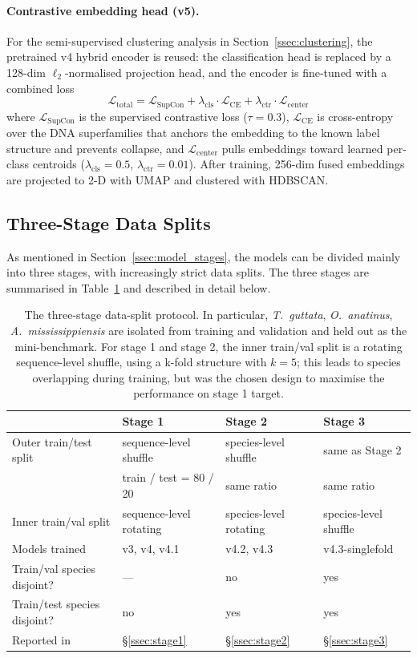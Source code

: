 \documentclass[12pt]{article}
\begin{document}
\paragraph{Contrastive embedding head (v5).} For the semi-supervised clustering analysis in Section~\ref{ssec:clustering}, the pretrained v4 hybrid encoder is reused: the classification head is replaced by a 128-dim $\ell_2$-normalised projection head, and the encoder is fine-tuned with a combined loss
\[
\mathcal{L}_{\text{total}} = \mathcal{L}_{\text{SupCon}} + \lambda_{\text{cls}} \cdot \mathcal{L}_{\text{CE}} + \lambda_{\text{ctr}} \cdot \mathcal{L}_{\text{center}}
\]
where $\mathcal{L}_{\text{SupCon}}$ is the supervised contrastive loss \cite{khosla2020supervised} ($\tau = 0.3$), $\mathcal{L}_{\text{CE}}$ is cross-entropy over the DNA superfamilies that anchors the embedding to the known label structure and prevents collapse, and $\mathcal{L}_{\text{center}}$ pulls embeddings toward learned per-class centroids ($\lambda_{\text{cls}} = 0.5$, $\lambda_{\text{ctr}} = 0.01$). After training, 256-dim fused embeddings are projected to 2-D with UMAP and clustered with HDBSCAN.

\subsection{Three-Stage Data Splits}\label{ssec:splits}

As mentioned in Section~\ref{ssec:model_stages}, the models can be divided mainly into three stages, with increasingly strict data splits. The three stages are summarised in Table~\ref{tab:splits} and described in detail below. 

\begin{table}[h]
\centering
\caption{The three-stage data-split protocol. In particular, \textit{T.~guttata}, \textit{O.~anatinus}, \textit{A.~mississippiensis} are isolated from training and validation and held out as the mini-benchmark. For stage 1 and stage 2, the inner train/val split is a rotating sequence-level shuffle, using a k-fold structure with $k=5$; this leads to species overlapping during training, but was the chosen design to maximise the performance on stage 1 target. }
\label{tab:splits}
\small
\begin{tabular}{llll}
\toprule
& Stage 1 & Stage 2 & Stage 3 \\
\midrule
Outer train/test split & sequence-level shuffle & species-level shuffle & same as Stage 2 \\
                       & train / test = 80 / 20  & same ratio & same ratio \\
Inner train/val split & sequence-level rotating & species-level rotating & species-level shuffle \\
Models trained        & v3, v4, v4.1 & v4.2, v4.3 & v4.3-singlefold \\
Train/val species disjoint? & --- & no & yes \\
Train/test species disjoint? & no & yes & yes \\
Reported in   & §\ref{ssec:stage1} & §\ref{ssec:stage2} & §\ref{ssec:stage3} \\
\bottomrule
\end{tabular}
\end{table}
\end{document}
